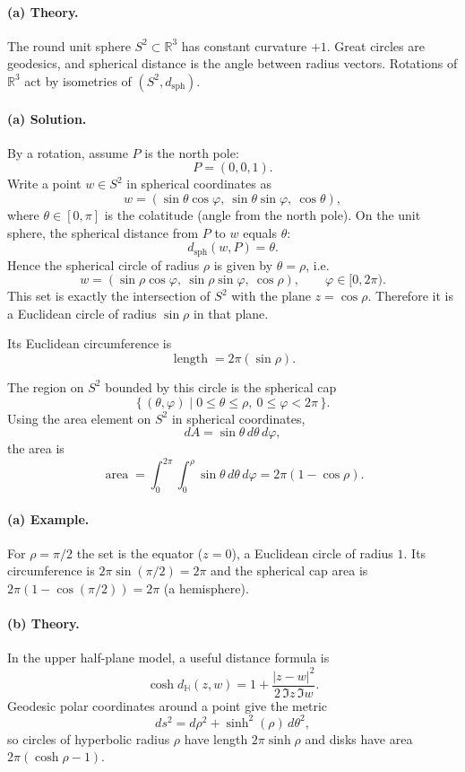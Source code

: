 \documentclass[12pt,a4paper]{article}
\newcommand{\hyp}{\mathbb{H}}
\newcommand{\R}{\mathbb{R}}
\theoremstyle{plain}
\newcommand{\sph}{\mathrm{sph}}
\theoremstyle{definition}      %
\begin{document}
	\paragraph{(a) Theory.}
	The round unit sphere $S^2\subset\R^3$ has constant curvature $+1$.
	Great circles are geodesics, and spherical distance is the angle between radius
	vectors. Rotations of $\R^3$ act by isometries of $(S^2,d_{\sph})$.
	
	\paragraph{(a) Solution.}
	By a rotation, assume $P$ is the north pole:
	\[
	P=(0,0,1).
	\]
	Write a point $w\in S^2$ in spherical coordinates as
	\[
	w=(\sin\theta\cos\varphi,\ \sin\theta\sin\varphi,\ \cos\theta),
	\]
	where $\theta\in[0,\pi]$ is the colatitude (angle from the north pole).
	On the unit sphere, the spherical distance from $P$ to $w$ equals $\theta$:
	\[
	d_{\sph}(w,P)=\theta.
	\]
	Hence the spherical circle of radius $\rho$ is given by $\theta=\rho$, i.e.
	\[
	w=(\sin\rho\cos\varphi,\ \sin\rho\sin\varphi,\ \cos\rho),
	\qquad \varphi\in[0,2\pi).
	\]
	This set is exactly the intersection of $S^2$ with the plane $z=\cos\rho$.
	Therefore it is a Euclidean circle of radius $\sin\rho$ in that plane.
	
	Its Euclidean circumference is
	\[
	\operatorname{length}=2\pi(\sin\rho).
	\]
	
	The region on $S^2$ bounded by this circle is the spherical cap
	\[
	\{\,(\theta,\varphi)\mid 0\le \theta\le \rho,\ 0\le \varphi<2\pi\,\}.
	\]
	Using the area element on $S^2$ in spherical coordinates,
	\[
	dA=\sin\theta\,d\theta\,d\varphi,
	\]
	the area is
	\[
	\operatorname{area}
	=\int_0^{2\pi}\int_0^\rho \sin\theta\,d\theta\,d\varphi
	=2\pi(1-\cos\rho).
	\]
	
	\paragraph{(a) Example.}
	For $\rho=\pi/2$ the set is the equator ($z=0$), a Euclidean circle of radius $1$.
	Its circumference is $2\pi\sin(\pi/2)=2\pi$ and the spherical cap area is
	$2\pi(1-\cos(\pi/2))=2\pi$ (a hemisphere).
	
	\paragraph{(b) Theory.}
	In the upper half-plane model, a useful distance formula is
	\[
	\cosh d_{\hyp}(z,w)
	=1+\frac{|z-w|^2}{2\,\Im z\,\Im w}.
	\]
	Geodesic polar coordinates around a point give the metric
	\[
	ds^2=d\rho^2+\sinh^2(\rho)\,d\theta^2,
	\]
	so circles of hyperbolic radius $\rho$ have length $2\pi\sinh\rho$ and disks have
	area $2\pi(\cosh\rho-1)$.
	
\end{document}
